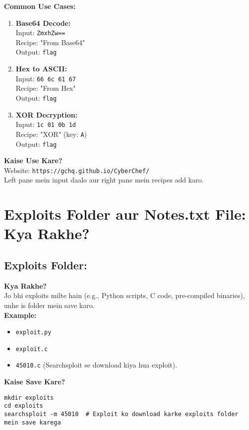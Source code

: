 \documentclass[a4paper]{article}
\begin{document}
\textbf{Common Use Cases:} \\
\begin{enumerate}
  \item \textbf{Base64 Decode:} \\
    Input: \texttt{ZmxhZw==} \\
    Recipe: "From Base64" \\
    Output: \texttt{flag}
  \item \textbf{Hex to ASCII:} \\
    Input: \texttt{66 6c 61 67} \\
    Recipe: "From Hex" \\
    Output: \texttt{flag}
  \item \textbf{XOR Decryption:} \\
    Input: \texttt{1c 01 0b 1d} \\
    Recipe: "XOR" (key: \texttt{A}) \\
    Output: \texttt{flag}
\end{enumerate}

\textbf{Kaise Use Kare?} \\
Website: \texttt{https://gchq.github.io/CyberChef/} \\
Left pane mein input daalo aur right pane mein recipes add karo.

\section{Exploits Folder aur Notes.txt File: Kya Rakhe?}
\subsection{Exploits Folder:}
\textbf{Kya Rakhe?} \\
Jo bhi exploits milte hain (e.g., Python scripts, C code, pre-compiled binaries), unhe is folder mein save karo. \\
\textbf{Example:} \\
\begin{itemize}
  \item \texttt{exploit.py}
  \item \texttt{exploit.c}
  \item \texttt{45010.c} (Searchsploit se download kiya hua exploit).
\end{itemize}

\textbf{Kaise Save Kare?} \\
\begin{lstlisting}
mkdir exploits  
cd exploits  
searchsploit -m 45010  # Exploit ko download karke exploits folder mein save karega
\end{lstlisting}
\end{document}
